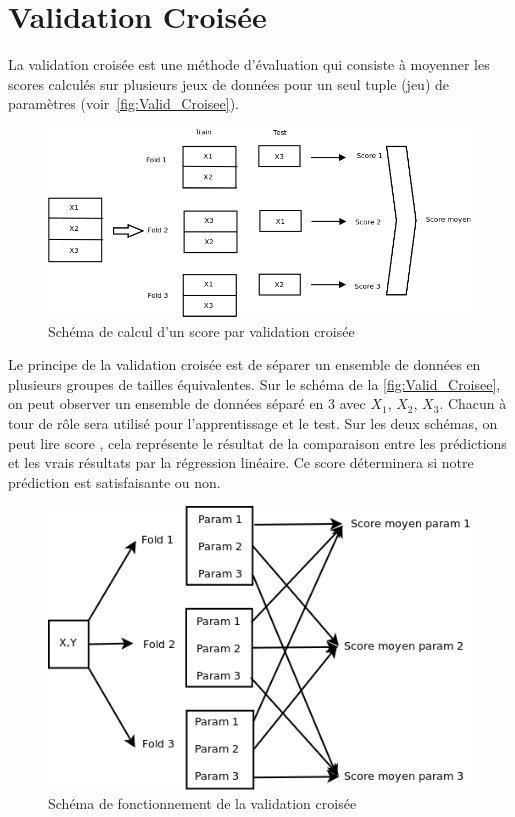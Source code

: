 \section{Validation Croisée}

La validation croisée est une méthode d'évaluation qui consiste à moyenner les scores calculés sur plusieurs jeux de données pour un seul tuple (jeu) de paramètres (voir~\autoref{fig:Valid_Croisee}).

\begin{figure}[htpb]
	\centering
	\includegraphics[scale = 0.25]{images/Valid_Croisee_param}
	\caption{Schéma de calcul d'un score par validation croisée}
	\label{fig:Valid_Croisee}
\end{figure}


Le principe de la validation croisée est de séparer un ensemble de données en plusieurs groupes de tailles équivalentes.
Sur le schéma de la  \autoref{fig:Valid_Croisee}, on peut observer un ensemble de données séparé en 3 avec $X_{1}$, $X_{2}$, $X_{3}$.
Chacun à tour de rôle sera utilisé pour l'apprentissage et le test. 
Sur les deux schémas, on peut lire \og{} score \fg{}, cela représente le résultat de la comparaison entre les prédictions et les vrais résultats par la régression linéaire. Ce score déterminera si notre prédiction est satisfaisante ou non. 

\begin{figure}[htpb]
	\centering
	\includegraphics[scale = 0.25]{images/Valid_Croisee}
	\caption{Schéma de fonctionnement de la validation croisée}
	\label{fig:Valid_Croisee_param}
\end{figure}

